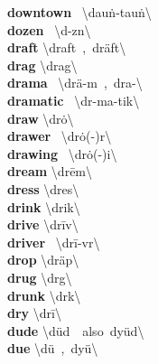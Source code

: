\documentclass[10pt,a4paper]{article}
\begin{document}
\begin{multicols}{2}
\textbf{ downtown }\quad \ \textbackslash \textsecstress dau\. n-\textprimstress tau\. n\textbackslash \\
\textbf{ dozen }\quad \ \textbackslash \textprimstress d\textschwa -z\textsuperscript{\textreve}n\textbackslash \\
\textbf{ draft }\quad \textbackslash \textprimstress draft\ ,\ \textprimstress dr\"{a}ft\textbackslash \\
\textbf{ drag }\quad \textbackslash \textprimstress drag\textbackslash \\
\textbf{ drama }\quad \ \textbackslash \textprimstress dr\"{a}-m\textschwa \ ,\ \textprimstress dra-\textbackslash \\
\textbf{ dramatic }\quad \ \textbackslash dr\textschwa -\textprimstress ma-tik\textbackslash \\
\textbf{ draw }\quad \textbackslash \textprimstress dr\.{o}\textbackslash \\
\textbf{ drawer }\quad \ \textbackslash \textprimstress dr\.{o}(-\textschwa )r\textbackslash \\
\textbf{ drawing }\quad \ \textbackslash \textprimstress dr\.{o}(-)i\engma \textbackslash \\
\textbf{ dream }\quad \textbackslash \textprimstress dr\={e}m\textbackslash \\
\textbf{ dress }\quad \textbackslash \textprimstress dres\textbackslash \\
\textbf{ drink }\quad \textbackslash \textprimstress dri\engma k\textbackslash \\
\textbf{ drive }\quad \textbackslash \textprimstress dr\={i}v\textbackslash \\
\textbf{ driver }\quad \ \textbackslash \textprimstress dr\={i}-v\textschwa r\textbackslash \\
\textbf{ drop }\quad \textbackslash \textprimstress dr\"{a}p\textbackslash \\
\textbf{ drug }\quad \textbackslash \textprimstress dr\textschwa g\textbackslash \\
\textbf{ drunk }\quad \textbackslash \textprimstress dr\textschwa \engma k\textbackslash \\
\textbf{ dry }\quad \textbackslash \textprimstress dr\={i}\textbackslash \\
\textbf{ dude }\quad \textbackslash \textprimstress d\"{u}d\ \ also\ \textprimstress dy\"{u}d\textbackslash \\
\textbf{ due }\quad \textbackslash \textprimstress d\"{u}\ ,\ \textprimstress dy\"{u}\textbackslash \\

\end{multicols}
\end{document}
